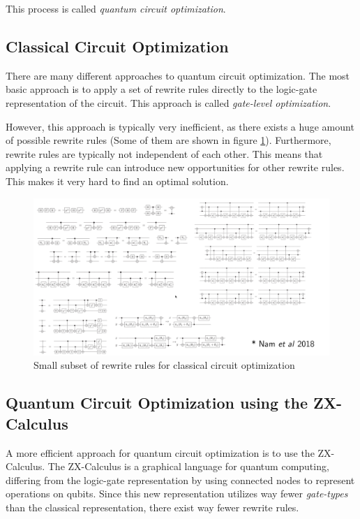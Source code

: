 This process is called \textit{quantum circuit optimization}.

\subsection{Classical Circuit Optimization}

There are many different approaches to quantum circuit optimization. The most basic approach is to apply a set of rewrite rules directly to the logic-gate representation of the circuit. This approach is called \textit{gate-level optimization}. \cite{namyross2018automated}

However, this approach is typically very inefficient, as there exists a huge amount of possible rewrite rules (Some of them are shown in figure \ref{fig:rewrite_rules_classical}). Furthermore, rewrite rules are typically not independent of each other. This means that applying a rewrite rule can introduce new opportunities for other rewrite rules. This makes it very hard to find an optimal solution. \cite{alexkissinger2020introductionzx}

\begin{figure}[h]
    \centering
    \includegraphics[width=\linewidth]{images/rewrite_rules_classical.png}
    \caption{Small subset of rewrite rules for classical circuit optimization
            {\cite{alexkissinger2020introductionzx}}}
    \label{fig:rewrite_rules_classical}
\end{figure}


\subsection{Quantum Circuit Optimization using the ZX-Calculus}

A more efficient approach for quantum circuit optimization is to use the ZX-Calculus. The ZX-Calculus is a graphical language for quantum computing, differing from the logic-gate representation by using connected nodes to represent operations on qubits. Since this new representation utilizes way fewer \textit{gate-types} than the classical representation, there exist way fewer rewrite rules.